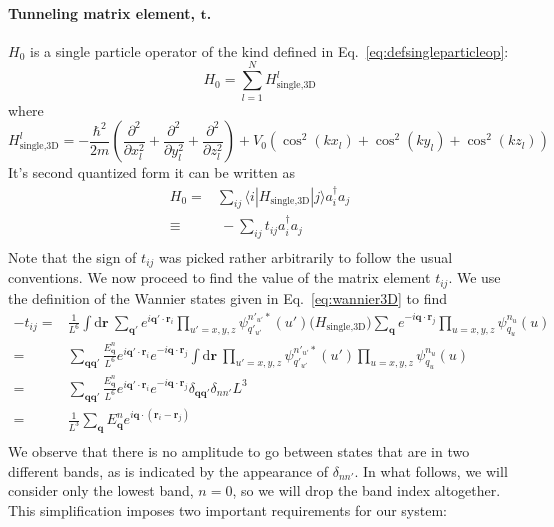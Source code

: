 \documentclass[oneside,11pt]{memoir}
\newcommand{\bv}[1]{\ensuremath{\bm{#1}}}
\newcommand{\vo}{\ensuremath{V_{0}}}
\begin{document}
\paragraph{Tunneling matrix element, $\bm{t}$.} $H_{0}$ is a single particle
operator of the kind defined in Eq.~\ref{eq:defsingleparticleop}:
\begin{equation}
  H_{0} = 
     \sum_{l=1}^{N} H_{\text{single,3D}}^{l}
\end{equation}
where 
\begin{equation}
H_{\text{single,3D}}^{l} = 
  -\frac{\hbar^{2}}{2m} \left( \frac{\partial^{2}}{\partial x_{l}^{2}}
                            + \frac{\partial^{2}}{\partial y_{l}^{2}}
                            + \frac{\partial^{2}}{\partial z_{l}^{2}} \right)
 + \vo\left( \cos^{2}(kx_{l})  + \cos^{2}(ky_{l}) + \cos^{2}(kz_{l}) \right) 
\end{equation}
It's second quantized form it can be written as 
\begin{equation}
\begin{split}
  H_{0} = & \sum_{ij} \langle i| H_{\text{single,3D}} |j \rangle a_{i}^{\dagger} a_{j} \\
        \equiv & ~ -\sum_{ij} t_{ij}  a_{i}^{\dagger} a_{j} \\
\end{split}
\end{equation}  
Note that the sign of $t_{ij}$ was picked rather arbitrarily to follow the
usual conventions.  We now proceed to find the value of the matrix element
$t_{ij}$.  We use the definition of the Wannier states given in
Eq.~\ref{eq:wannier3D} to find 
\begin{equation}
\begin{split}
-t_{ij}  
= & 
  \frac{1}{L^{6}}\int \mathrm{d}\bv{r}\ 
     \sum_{\bv{q}'} e^{i \bv{q'}\cdot\bv{r}_{i} }
     \prod_{u'=x,y,z}  \psi_{q'_{u'}}^{n'_{u'}*}(u') 
  \Big( H_{\text{single,3D}}  \Big)
     \sum_{\bv{q}} e^{-i \bv{q}\cdot\bv{r}_{j} }
     \prod_{u=x,y,z}  \psi_{q_{u}}^{n_{u}}(u)\\ 
= &
  \sum_{\bv{q}\bv{q}'}   
  \frac{E_{\bv{q}}^{n}}{L^{6}}
   e^{ i \bv{q}'\cdot\bv{r}_{i} }  e^{ -i \bv{q}\cdot\bv{r}_{j} }
   \int\mathrm{d}\bv{r}\ 
     \prod_{u'=x,y,z}  \psi_{q'_{u'}}^{n'_{u'}*}(u') 
     \prod_{u=x,y,z}  \psi_{q_{u}}^{n_{u}}(u) \\ 
= &
  \sum_{\bv{q}\bv{q}'}   
  \frac{E_{\bv{q}}^{n}}{L^{6}}
   e^{ i \bv{q}'\cdot\bv{r}_{i} }  e^{ -i \bv{q}\cdot\bv{r}_{j} }
   \delta_{\bv{q}\bv{q}'} \delta_{nn'} L^{3} \\
= &
  \frac{1}{L^{3}}
  \sum_{\bv{q}}   E_{\bv{q}}^{n}
   e^{ i \bv{q}\cdot(\bv{r}_{i} - \bv{r}_{j}) } \\
\end{split} 
\end{equation}
We observe that there is no amplitude to go between states that are in two
different bands, as is indicated by the appearance of $\delta_{nn'}$.   In what
follows, we will consider only the lowest band, $n=0$,  so we will drop the
band index altogether.  This simplification imposes two important requirements
for our system:
 
\end{document}
